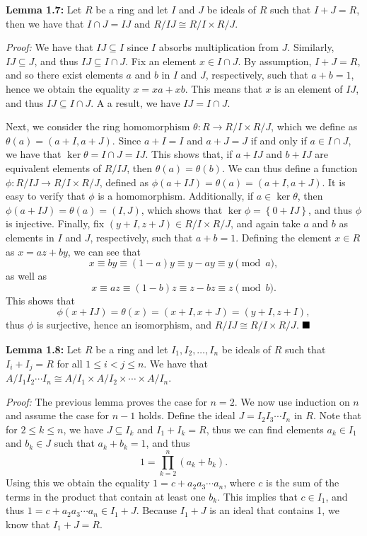 \documentclass[12pt]{article}
\newcommand{\braceb}[1]{\left\{#1\right\}}
\newcommand{\proof}{\textit{Proof: }}
\newcommand{\done}{\ensuremath{\strut\hfill\blacksquare}}
\begin{document}
\textbf{Lemma 1.7:}
Let \( R \) be a ring and let \( I \) and \( J \) be ideals of \( R \) such
that \( I + J = R \), then we have that \( I \cap J = IJ \) and
\( R/IJ \cong R/I \times R/J \).

\proof
We have that \( IJ \subseteq I \) since \( I \) absorbs multiplication from
\( J \).
Similarly, \( IJ \subseteq J \), and thus \( IJ \subseteq I \cap J \).
Fix an element \( x \in I \cap J \).
By assumption, \( I + J = R \), and so there exist elements \( a \) and \( b \)
in \( I \) and \( J \), respectively, such that \( a + b = 1 \), hence we
obtain the equality \( x = xa + xb \).
This means that \( x \) is an element of \( IJ \), and thus
\( IJ \subseteq I \cap J \).
A a result, we have \( IJ = I \cap J \).

Next, we consider the ring homomorphism \( \theta : R \to R/I \times R/J \),
which we define as \( \theta(a) = (a + I, a + J) \).
Since \( a + I = I \) and \( a + J = J \) if and only if \( a \in I \cap J \),
we have that \( \ker\theta = I \cap J = IJ \).
This shows that, if \( a + IJ \) and \( b + IJ \) are equivalent elements of
\( R/IJ \), then \( \theta(a) = \theta(b) \).
We can thus define a function \( \phi : R/IJ \to R/I \times R/J \), defined
as \( \phi(a + IJ) = \theta(a) = (a + I, a + J) \).
It is easy to verify that \( \phi \) is a homomorphism.
Additionally, if \( a \in \ker\theta \), then
\( \phi(a + IJ) = \theta(a) = (I,J) \), which shows that
\( \ker\phi = \braceb{0 + IJ} \), and thus \( \phi \) is injective.
Finally, fix \( (y + I, z + J) \in R/I \times R/J \), and again take \( a \)
and \( b \) as elements in \( I \) and \( J \), respectively, such that
\( a + b = 1 \).
Defining the element \( x \in R \) as \( x = az + by \), we can see that
\[
	x \equiv by \equiv (1 - a)y \equiv y - ay \equiv y \pmod{a},
\]
as well as
\[
	x \equiv az \equiv (1 - b)z \equiv z - bz \equiv z \pmod{b}.
\]
This shows that
\[
	\phi(x + IJ) = \theta(x) = (x + I, x + J) = (y + I, z + I),
\]
thus \( \phi \) is surjective, hence an isomorphism, and
\( R/IJ \cong R/I \times R/J \).
\done

\textbf{Lemma 1.8:}
Let \( R \) be a ring and let \( I_1, I_2, \dots, I_n \) be ideals of \( R \)
such that \( I_i + I_j = R \) for all \( 1 \leq i < j \leq n \).
We have that
\( A/I_1I_2 \cdots I_n \cong A/I_1 \times A/I_2 \times \cdots \times A/I_n \).

\proof
The previous lemma proves the case for \( n = 2 \).
We now use induction on \( n \) and assume the case for \( n - 1 \) holds.
Define the ideal \( J = I_2I_3 \cdots I_n \) in \( R \).
Note that for \( 2 \leq k \leq n \), we have \( J \subseteq I_k \) and
\( I_1 + I_k = R \), thus we can find elements \( a_k \in I_1 \) and
\( b_k \in J \) such that \( a_k + b_k = 1 \), and thus
\[
	1 = \prod_{k = 2}^n (a_k + b_k).
\]
Using this we obtain the equality \( 1 = c + a_2a_3 \cdots a_n \), where
\( c \) is the sum of the terms in the product that contain at least one
\( b_k \).
This implies that \( c \in I_1 \), and thus
\( 1 = c + a_2a_3 \cdots a_n \in I_1 + J \).
Because \( I_1 + J \) is an ideal that contains 1, we know that
\( I_1 + J = R \).
\end{document}
